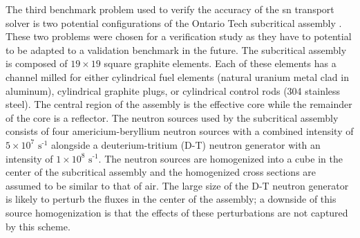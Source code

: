 The third benchmark problem used to verify the accuracy of the \acrshort{sn} transport solver is two potential configurations of the Ontario Tech subcritical assembly \cite{ks_2024_subcritical}. These two problems were chosen for a verification study as they have to potential to be adapted to a validation benchmark in the future. The subcritical assembly is composed of $19\times 19$ square graphite elements. Each of these elements has a channel milled for either cylindrical fuel elements (natural uranium metal clad in aluminum), cylindrical graphite plugs, or cylindrical control rods (304 stainless steel). The central region of the assembly is the effective core while the remainder of the core is a reflector. The neutron sources used by the subcritical assembly consists of four americium-beryllium neutron sources with a combined intensity of $5\times 10^{7}\text{ s}^{\text{-1}}$ alongside a deuterium-tritium (D-T) neutron generator with an intensity of $1\times 10^{8}\text{ s}^{\text{-1}}$. The neutron sources are homogenized into a cube in the center of the subcritical assembly and the homogenized cross sections are assumed to be similar to that of air. The large size of the D-T neutron generator is likely to perturb the fluxes in the center of the assembly; a downside of this source homogenization is that the effects of these perturbations are not captured by this scheme. 
